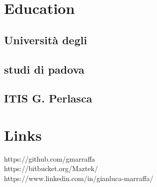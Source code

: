 \documentclass[]{deedy-resume-openfont}
\begin{document}
\begin{minipage}[t]{0.33\textwidth}


\section{Education}

\subsection{Università degli}
\subsection{studi di padova}
\sectionsep

\subsection{ITIS G. Perlasca}
\sectionsep


\section{Links}
https://github.com/gmarraffa \\
https://bitbucket.org/Maztek/ \\
https://www.linkedin.com/in/gianluca-marraffa/
\sectionsep



\end{minipage}
\end{document}
